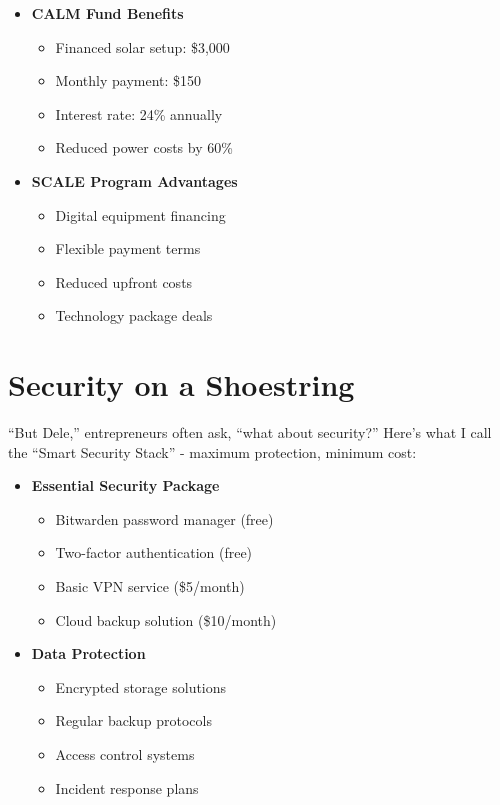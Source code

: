 \begin{itemize}
    \item \textbf{CALM Fund Benefits}
    \begin{itemize}
        \item Financed solar setup: \$3,000
        \item Monthly payment: \$150
        \item Interest rate: 24\% annually
        \item Reduced power costs by 60\%
    \end{itemize}

    \item \textbf{SCALE Program Advantages}
    \begin{itemize}
        \item Digital equipment financing
        \item Flexible payment terms
        \item Reduced upfront costs
        \item Technology package deals
    \end{itemize}
\end{itemize}

\section{Security on a Shoestring}\label{sec:budget-security}

``But Dele,'' entrepreneurs often ask, ``what about security?'' Here's what I call the ``Smart Security Stack'' - maximum protection, minimum cost:

\begin{itemize}
    \item \textbf{Essential Security Package}
    \begin{itemize}
        \item Bitwarden password manager (free)
        \item Two-factor authentication (free)
        \item Basic VPN service (\$5/month)
        \item Cloud backup solution (\$10/month)
    \end{itemize}

    \item \textbf{Data Protection}
    \begin{itemize}
        \item Encrypted storage solutions
        \item Regular backup protocols
        \item Access control systems
        \item Incident response plans
    \end{itemize}
\end{itemize}

